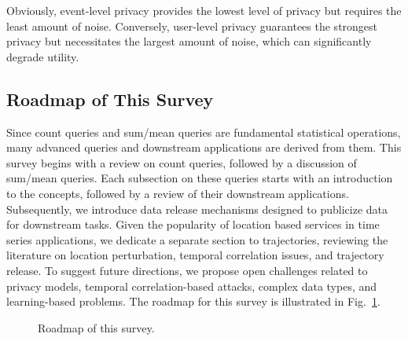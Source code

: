 Obviously, event-level privacy provides the lowest level of privacy but requires the least amount of noise. Conversely, user-level privacy guarantees the strongest privacy but necessitates the largest amount of noise, which can significantly degrade utility.


\subsection{Roadmap of This Survey}
Since count queries and sum/mean queries are fundamental statistical operations, many advanced queries and downstream applications are derived from them. This survey begins with a review on count queries, followed by a discussion of sum/mean queries.  Each subsection on these queries starts with an introduction to the concepts, followed by a review of their downstream applications. Subsequently, we introduce data release mechanisms designed to publicize data for downstream tasks. Given the popularity of location based services in time series applications, we dedicate a separate section to trajectories, reviewing the literature on  location perturbation, temporal correlation issues, and trajectory release. To suggest future directions, we propose open challenges related to privacy models, temporal correlation-based attacks, complex data types, and learning-based problems. The roadmap for this survey is illustrated in Fig.~\ref{rm}.
\begin{figure}[htbp]
	\caption{Roadmap of this survey.}
	\label{rm}
\end{figure}








